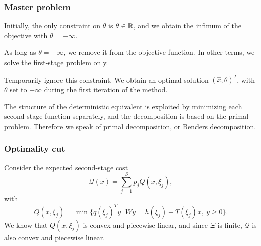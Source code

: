 \documentclass{beamer}
\begin{document}
\begin{frame}
\frametitle{Master problem}
	
Initially, the only constraint on $\theta$ is $\theta \in {\mathbb{R}}$, and we obtain the infimum of the objective with $\theta = -\infty$.	


\mbox{}

As long as $\theta = -\infty$, we remove it from the objective function.
In other terms, we solve the first-stage problem only.

	
	\mbox{}

{\blue Temporarily ignore} this constraint.
We obtain an optimal solution $(\hat{x}, \theta)^T$, with $\theta$ set to $-\infty$ during the first iteration of the method.

\mbox{}

The structure of the deterministic equivalent is exploited by minimizing each second-stage function separately, and the decomposition is based on the primal problem.
Therefore we speak of primal decomposition, or Benders decomposition.	

\end{frame}

\begin{frame}
\frametitle{Optimality cut}
	
Consider the expected second-stage cost
\[
\mathcal{Q}(x) = \sum_{j=1}^S p_jQ(x,\xi_j),
\]
with
\[
Q(x,\xi_j) = \min \lbrace q(\xi_j)^Ty \,|\, Wy = h(\xi_j)-T(\xi_j)x,\
y \geq 0 \rbrace.
\]
We know that $Q(x,\xi_j)$ is convex and piecewise linear, and since $\Xi$ is finite, $\mathcal{Q}$ is also convex and piecewise linear.
	
	
	
\end{frame}
\end{document}
